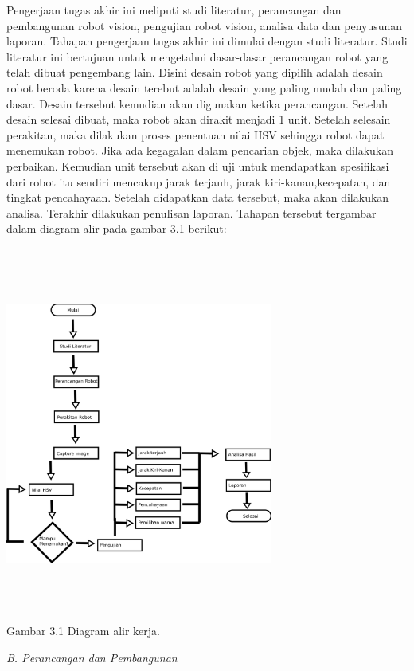 \documentclass[10pt,journal,compsoc]{IEEEtran}
\begin{document}
  Pengerjaan tugas akhir ini meliputi studi literatur, perancangan dan pembangunan robot vision, pengujian robot vision, analisa data dan penyusunan laporan. 
  Tahapan pengerjaan tugas akhir ini dimulai dengan studi literatur. 
  Studi literatur ini bertujuan untuk mengetahui dasar-dasar perancangan robot yang telah dibuat pengembang lain.
  Disini desain robot yang dipilih adalah desain robot beroda karena desain terebut adalah desain yang paling mudah dan paling dasar. 
  Desain tersebut kemudian akan digunakan ketika perancangan. 
  Setelah desain selesai dibuat, maka robot akan dirakit menjadi 1 unit. 
  Setelah selesain perakitan, maka dilakukan proses penentuan nilai HSV sehingga robot dapat menemukan robot. 
  Jika ada kegagalan dalam pencarian objek, maka dilakukan perbaikan. 
  Kemudian unit tersebut akan di uji untuk mendapatkan spesifikasi dari robot itu sendiri mencakup jarak terjauh, jarak kiri-kanan,kecepatan, dan tingkat pencahayaan. 
  Setelah didapatkan data tersebut, maka akan dilakukan analisa. 
  Terakhir dilakukan penulisan laporan.
  Tahapan tersebut tergambar dalam diagram alir pada gambar 3.1 berikut:
  \begin{center}
    \includegraphics[width=250pt,height=350pt]{work}\\
    Gambar 3.1 Diagram alir kerja.
  \end{center}
  
  \noindent \textit{B. Perancangan dan Pembangunan}
  
\end{document}
